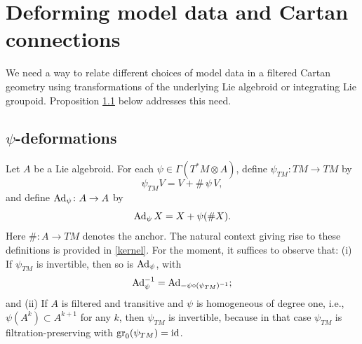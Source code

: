 \documentclass[leqno,12pt]{amsart} %
\newcommand\refreshpage{\newpage}
\newcommand\refreshpage{}
\begin{document}



\refreshpage
\section{Deforming model data and Cartan connections}\label{deform}
We need a way to relate different choices of model data in a filtered Cartan geometry
using transformations of the underlying Lie algebroid or integrating Lie
groupoid. Proposition \ref{deformations} below addresses this need.

\subsection{$\psi$-deformations}\label{deformations}
Let $A$ be a Lie algebroid. For each $\psi \in \Gamma(T^*\!M \otimes A) $, define
$\psi_{TM}:TM \rightarrow TM$ by
\begin{equation}\label{opal1}
  \psi_{TM} V = V + \#\,\psi\,V,
\end{equation}
and define $\operatorname{Ad}_\psi \colon A \rightarrow A$ by
\begin{equation}
  \label{opal2a}
  \operatorname{Ad}_\psi X = X + \psi(\#X).
\end{equation}
Here $\# \colon A \rightarrow TM$ denotes the anchor. The natural context giving rise to
these definitions is provided in \ref{kernel}. For the moment, it suffices to observe
that: (i) If $\psi_{TM}$ is invertible,
then so is $\operatorname{Ad}_\psi$, with
\begin{equation}
  \label{opal2}
  \operatorname{Ad}_\psi^{-1} = \operatorname{Ad}_{-\psi\circ(\psi_{TM})^{-1}};
\end{equation}
and (ii) If $A$ is filtered and transitive and $\psi$ is homogeneous of degree one, i.e.,
$\psi(A^k) \subset A^{k+1}$ for any $k$, then $\psi_{TM}$ is invertible, because in that
case $\psi_{TM}$ is filtration-preserving with
$\operatorname{\operatorname{gr}}_0(\psi_{TM})=\mathrm{id}$.
\end{document}
